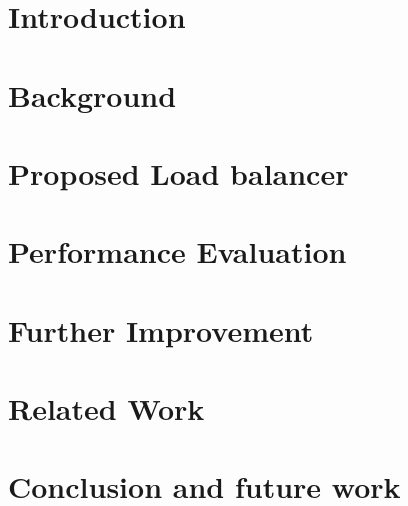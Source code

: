 
\graphicspath{{Manuscript/}}

\chapter{Introduction}\label{chapter:introduction}


\chapter{Background}\label{chapter:background}


\chapter{Proposed Load balancer}\label{chapter:architecture}




\chapter{Performance Evaluation}\label{chapter:evaluation}


\chapter{Further Improvement}\label{chapter:performance}


\chapter{Related Work}\label{chapter:related}


\chapter{Conclusion and future work }\label{chapter:conclusion}



%


